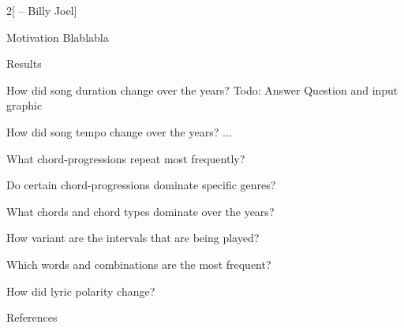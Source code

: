 \begin{frame}{}
\begin{multicols}{2}[\textit{} -- Billy Joel]
    \begin{block}{Motivation} 
        Blablabla
    \end{block}
    \begin{block}{Results}
    \end{block}

    \begin{block}{How did song duration change over the years?}
        Todo: Answer Question and input graphic
    \end{block}
    \begin{block}{How did song tempo change over the years?}
        ...
    \end{block}
    \begin{block}{What chord-progressions repeat most frequently?}
    \end{block}
    \begin{block}{Do certain chord-progressions dominate specific genres?}
    \end{block}
    \begin{block}{What chords and chord types dominate over the years?}
    \end{block}
    \begin{block}{How variant are the intervals that are being played?}
    \end{block}
    \begin{block}{Which words and combinations are the most frequent?}
    \end{block}
    \begin{block}{How did lyric polarity change?}
    \end{block}
    \begin{block}{References}
        \printbibliography
    \end{block}
\end{multicols}


\end{frame}


